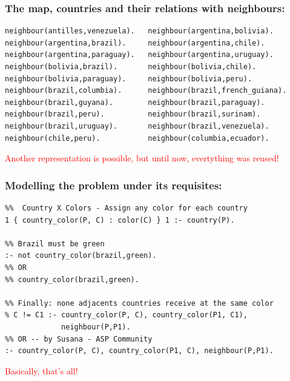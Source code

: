 \documentclass{beamer}
\begin{document}
\begin{frame}[fragile] 
	\frametitle{The map, countries and their relations with neighbours:}
	
{\small
\begin{verbatim}
neighbour(antilles,venezuela).   neighbour(argentina,bolivia).
neighbour(argentina,brazil).     neighbour(argentina,chile).
neighbour(argentina,paraguay).   neighbour(argentina,uruguay).
neighbour(bolivia,brazil).       neighbour(bolivia,chile).
neighbour(bolivia,paraguay).     neighbour(bolivia,peru).
neighbour(brazil,columbia).      neighbour(brazil,french_guiana).
neighbour(brazil,guyana).        neighbour(brazil,paraguay).
neighbour(brazil,peru).          neighbour(brazil,surinam).
neighbour(brazil,uruguay).       neighbour(brazil,venezuela).
neighbour(chile,peru).           neighbour(columbia,ecuador).

\end{verbatim}
}	
\textcolor{red}{Another representation is possible, but until now, evertything was reused!}
\end{frame}


\begin{frame}[fragile] 
	\frametitle{Modelling the problem under its requisites:}
	
{\small
\begin{verbatim}
%%  Country X Colors - Assign any color for each country
1 { country_color(P, C) : color(C) } 1 :- country(P).

%% Brazil must be green
:- not country_color(brazil,green).
%% OR
%% country_color(brazil,green).

%% Finally: none adjacents countries receive at the same color
% C != C1 :- country_color(P, C), country_color(P1, C1), 
             neighbour(P,P1).
%% OR -- by Susana - ASP Community         
:- country_color(P, C), country_color(P1, C), neighbour(P,P1).
\end{verbatim}
}	
\textcolor{red}{Basically, that's all!}
\end{frame}


\end{document}
